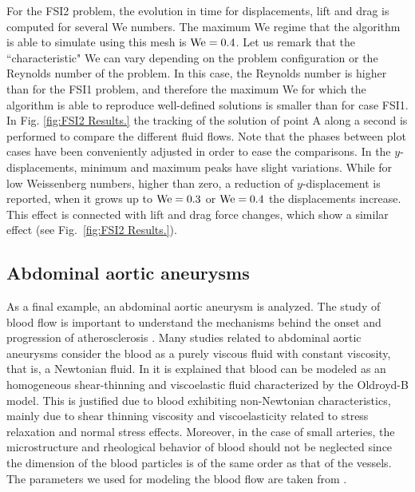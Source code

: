 \documentclass[11pt,english]{article}
\begin{document}
For the FSI2 problem, the evolution in time for displacements, lift and drag is computed for several We numbers. The maximum We regime that the algorithm is able to simulate using this mesh is ${\rm We} = 0.4$. Let us remark that the ``characteristic" We can vary depending on the problem configuration or the Reynolds number of the problem. In this case, the Reynolds number is higher than for the FSI1 problem, and therefore the maximum We  for which the algorithm is able to reproduce well-defined solutions is smaller than for case FSI1. In Fig. \ref{fig:FSI2 Results.} the tracking of the solution of point A along a second is performed to compare the different fluid flows. Note that the phases between plot cases have been conveniently adjusted in order to ease the comparisons. In the $y$-displacements, minimum and maximum peaks have slight variations. While for low Weissenberg numbers, higher than zero, a reduction of $y$-displacement is reported, when it grows up to ${\rm We}=0.3$ or ${\rm We}=0.4$ the displacements increase. This effect is connected with lift and drag force changes, which show a similar effect (see Fig.~\ref{fig:FSI2 Results.}). 

\subsection{Abdominal aortic aneurysms\label{subsec:aneurysm}}

As a final example, an abdominal aortic aneurysm is analyzed. The study of blood flow is important to understand the mechanisms behind the onset and progression of atherosclerosis \cite{Gharabi2016,Siasos2018}. Many studies related to abdominal aortic aneurysms consider the blood as a purely viscous fluid with constant viscosity, that is, a Newtonian fluid. In \cite{zaman2012blood,anand2013new} it is explained that blood can be modeled as an homogeneous shear-thinning and viscoelastic fluid characterized by the Oldroyd-B model. This is justified due to blood exhibiting non-Newtonian characteristics, mainly due to shear thinning viscosity and viscoelasticity related to stress relaxation and normal stress effects. Moreover, in the case of small arteries, the microstructure and rheological behavior of blood should not be neglected since the dimension of the blood particles is of the same order as that of the vessels. The parameters we used for modeling the blood flow are taken from \cite{elhanafy2019numerical}. 
\end{document}
